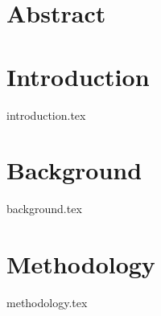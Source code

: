 \documentclass[titlepage, letterpaper, 12pt, oneside]{book}
\begin{document}

\frontmatter


\section*{Abstract}
{}


\tableofcontents
\listoffigures
\lstlistoflistings

\mainmatter
\doublespacing

\section{Introduction}
{introduction.tex}

\section{Background}
{background.tex}

\section{Methodology}\label{sec:methods}
{methodology.tex}
\end{document}
